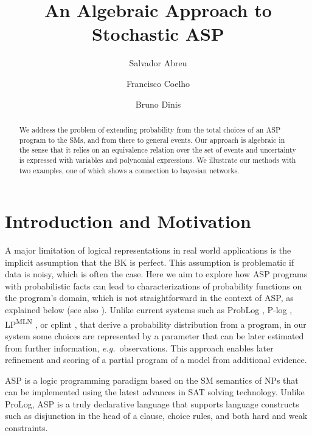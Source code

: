 \documentclass{llncs}
\begin{document}
%
%
%
%
%
	\title{An Algebraic Approach to Stochastic ASP}
	\author{Salvador Abreu \and   Francisco Coelho \and Bruno Dinis }
	\date{}
	\maketitle\thispagestyle{empty}
	
%
%
%
\begin{abstract}
    We address the problem of extending probability from the total choices of an \acs{ASP} program to the \aclp{SM}, and from there to general events.
    Our approach is algebraic in the sense that it relies on an equivalence relation over the set of events and uncertainty is expressed with variables and polynomial expressions.
    We illustrate our methods with two examples, one of which shows a connection to bayesian networks.
\end{abstract}
%
%
%
\section{Introduction and Motivation}
%
%
%
A major limitation of logical representations in real world applications is the implicit assumption that the \acl{BK} is perfect. This assumption is problematic if data is noisy, which is often the case. Here we aim to explore how \acl{ASP} programs with probabilistic facts can lead to characterizations of probability functions on the program's domain, which is not straightforward in the context of \acl{ASP}, as explained below (see also \cite{cozman2020joy,verreet2022inference,baral2009probabilistic,pajunen2021solution}). Unlike current systems such as ProbLog \cite{de2007problog}, P-log \cite{baral2009probabilistic}, LP\textsuperscript{MLN} \cite{lee2016weighted}, or cplint \cite{alberti2017cplint}, that derive a probability distribution from a program, in our system some choices are represented by a parameter that can be later estimated from further information, \emph{e.g.}\ observations. This approach enables later refinement and scoring of a partial program of a model from additional evidence.

\Ac{ASP} \cite{lifschitz2002answer} is a logic programming paradigm based on the \ac{SM} semantics of \acp{NP} that can be implemented using the latest advances in SAT solving technology. Unlike ProLog, \ac{ASP} is a truly declarative language that supports language constructs such as disjunction in the head of a clause, choice rules, and both hard and weak constraints.
\end{document}
